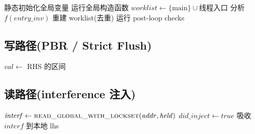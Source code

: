 \documentclass[11pt]{ctexart}
\begin{document}
\begin{algorithm}[htbp]
\caption{Thread-Modular 全局不动点迭代}
\begin{algorithmic}[1]
  \State 静态初始化全局变量 
  \State 运行全局构造函数 
  \State $\mathit{worklist} \gets \{\text{main}\} \cup \text{线程入口}$
      \State 分析 $f(\mathit{entry\_inv})$
    \EndFor
    \State {} 
     \State\Return{} \EndIf
    \State 重建 worklist(去重)
  \EndWhile
  \State 运行 post-loop checks 
\EndFunction
\end{algorithmic}
\end{algorithm}

\subsection{写路径(PBR / Strict Flush)}

\begin{algorithm}[htbp]
\caption{exec(Store) 的干扰发布}
\begin{algorithmic}[1]
  \State $\mathit{val} \gets$ RHS 的区间
      \State {} 
    \EndFor
  \Else
    \State {} 
  \EndIf
\EndFor
\end{algorithmic}
\end{algorithm}

\subsection{读路径(interference 注入)}

\begin{algorithm}[htbp]
\caption{exec(Load) 的锁感知吸收}
\begin{algorithmic}[1]
\State $\mathit{interf} \gets \Call{read\_global\_with\_lockset}{\mathit{addr}, \mathit{held}}$
  \State $\mathit{did\_inject} \gets true$
  \State 吸收 $\mathit{interf}$ 到本地 lhs
\EndIf
\end{algorithmic}
\end{algorithm}
\end{document}
